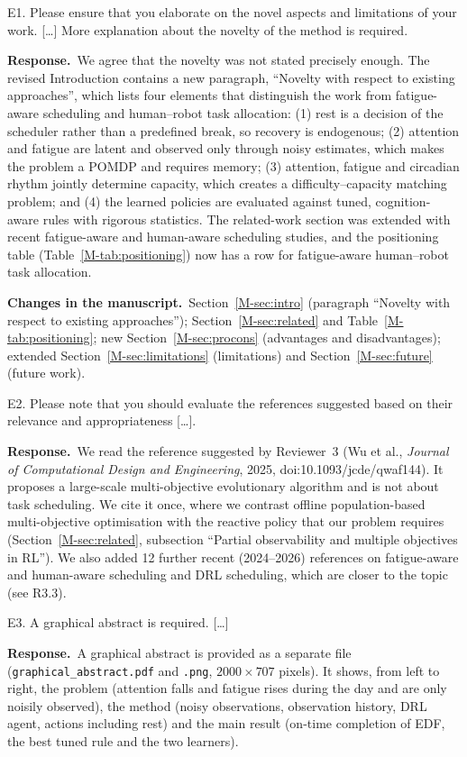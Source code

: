 \documentclass[11pt]{article}
\newcommand{\resp}{\par\smallskip\noindent\textbf{Response.}~}
\newcommand{\change}{\par\smallskip\noindent\textbf{Changes in the manuscript.}~}
\newcommand{\Sec}[1]{Section~\ref{M-#1}}
\newcommand{\Tab}[1]{Table~\ref{M-#1}}
\begin{document}
\begin{rcomment}{E1.}
Please ensure that you elaborate on the novel aspects and limitations of your work. [\dots] More explanation about the novelty of the method is required.
\end{rcomment}
\resp We agree that the novelty was not stated precisely enough. The revised Introduction contains a new paragraph, ``Novelty with respect to existing approaches'', which lists four elements that distinguish the work from fatigue-aware scheduling and human--robot task allocation: (1) rest is a decision of the scheduler rather than a predefined break, so recovery is endogenous; (2) attention and fatigue are latent and observed only through noisy estimates, which makes the problem a POMDP and requires memory; (3) attention, fatigue and circadian rhythm jointly determine capacity, which creates a difficulty--capacity matching problem; and (4) the learned policies are evaluated against tuned, cognition-aware rules with rigorous statistics. The related-work section was extended with recent fatigue-aware and human-aware scheduling studies, and the positioning table (\Tab{tab:positioning}) now has a row for fatigue-aware human--robot task allocation.
\change \Sec{sec:intro} (paragraph ``Novelty with respect to existing approaches''); \Sec{sec:related} and \Tab{tab:positioning}; new \Sec{sec:procons} (advantages and disadvantages); extended \Sec{sec:limitations} (limitations) and \Sec{sec:future} (future work).

\begin{rcomment}{E2.}
Please note that you should evaluate the references suggested based on their relevance and appropriateness [\dots].
\end{rcomment}
\resp We read the reference suggested by Reviewer~3 (Wu et al., \emph{Journal of Computational Design and Engineering}, 2025, doi:10.1093/jcde/qwaf144). It proposes a large-scale multi-objective evolutionary algorithm and is not about task scheduling. We cite it once, where we contrast offline population-based multi-objective optimisation with the reactive policy that our problem requires (\Sec{sec:related}, subsection ``Partial observability and multiple objectives in RL''). We also added 12 further recent (2024--2026) references on fatigue-aware and human-aware scheduling and DRL scheduling, which are closer to the topic (see R3.3).

\begin{rcomment}{E3.}
A graphical abstract is required. [\dots]
\end{rcomment}
\resp A graphical abstract is provided as a separate file (\texttt{graphical\_abstract.pdf} and \texttt{.png}, $2000\times 707$ pixels). It shows, from left to right, the problem (attention falls and fatigue rises during the day and are only noisily observed), the method (noisy observations, observation history, DRL agent, actions including rest) and the main result (on-time completion of EDF, the best tuned rule and the two learners).
\end{document}
